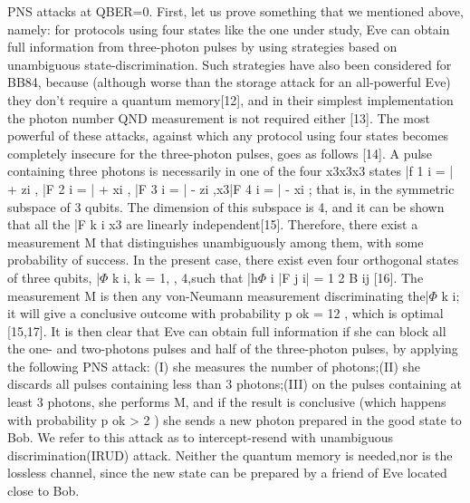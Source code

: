 PNS attacks at QBER=0. First, let us prove something that we mentioned above, namely: for protocols using four states like the one under study, Eve can obtain full information from three-photon pulses by using strategies based on unambiguous state-discrimination.
Such strategies have also been considered for BB84, because (although worse than the storage attack for an all-powerful Eve) they don’t require a quantum memory[12], and in their simplest implementation the photon number QND measurement is not required either [13].
The most powerful of these attacks, against which any protocol using four states becomes completely insecure for the three-photon pulses, goes as follows [14]. A pulse containing three photons is necessarily in one of the four x3x3x3 states |f 1 i = | + zi , |F 2 i = | + xi , |F 3 i = | - zi ,x3|F 4 i = | - xi ; that is, in the symmetric subspace of 3 qubits. The dimension of this subspace is 4, and it can be shown that all the |F k i x3 are linearly independent[15]. Therefore, there exist a measurement M that distinguishes unambiguously among them, with some probability of success. In the present case, there exist even four orthogonal states of three qubits, |$\Phi$ k i, k = 1,  , 4,such that |h$\Phi$ i |F j i| =  1 2 B ij [16]. The measurement M is then any von-Neumann measurement discriminating the|$\Phi$ k i; it will give a conclusive outcome with probability p ok = 12 , which is optimal [15,17].
It is then clear that Eve can obtain full information if she can block all the one- and two-photons pulses and half of the three-photon pulses, by applying the following PNS attack: (I) she measures the number of photons;(II) she discards all pulses containing less than 3 photons;(III) on the pulses containing at least 3 photons, she performs M, and if the result is conclusive (which happens with probability p ok > 2 ) she sends a new photon prepared in the good state to Bob. We refer to this attack as to intercept-resend with unambiguous discrimination(IRUD) attack. Neither the quantum memory is needed,nor is the lossless channel, since the new state can be prepared by a friend of Eve located close to Bob.

